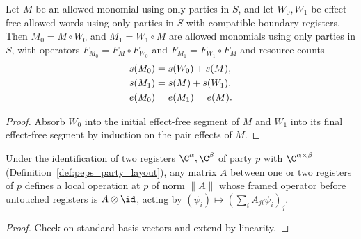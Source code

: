 \begin{lemma}
    \label{thm:peps_monomial_composition_counts}
    \leanok
    Let $M$ be an allowed monomial using only parties in $S$, and let $W_0,W_1$
    be effect-free allowed words using only parties in $S$ with compatible
    boundary registers. Then $M_0=M\circ W_0$ and $M_1=W_1\circ M$ are allowed
    monomials using only parties in $S$, with operators
    $F_{M_0}=F_M\circ F_{W_0}$ and $F_{M_1}=F_{W_1}\circ F_M$ and resource
    counts
    \begin{align}
        s(M_0) & =s(W_0)+s(M),\notag \\
        s(M_1) & =s(M)+s(W_1),\notag \\
        e(M_0) & =e(M_1)=e(M).
        \label{eq:peps_monomial_composition_counts}
    \end{align}
\end{lemma}

\begin{proof}\leanok
    Absorb $W_0$ into the initial effect-free segment of $M$ and $W_1$ into its
    final effect-free segment by induction on the pair effects of $M$.
\end{proof}

\begin{lemma}
    \label{lem:peps_front_registers}
    \leanok
    Under the identification of two registers $\C^\alpha,\C^\beta$ of party $p$
    with $\C^{\alpha\times\beta}$ (Definition~\ref{def:peps_party_layout}), any
    matrix $A$ between one or two registers of $p$ defines a local operation at
    $p$ of norm $\|A\|$ whose framed operator before untouched registers is
    $A\otimes\id$, acting by $(\psi_i)\mapsto(\sum_i A_{ji}\psi_i)_j$.
\end{lemma}

\begin{proof}\leanok
    Check on standard basis vectors and extend by linearity.
\end{proof}

